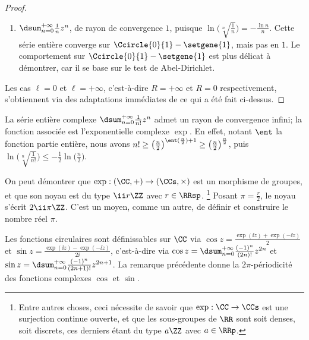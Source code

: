 \begin{proof}
\begin{itemize}
\begin{enumerate}[label=(\alph*)]
	        \item $\dsum_{n=0}^{+\infty}  \frac{1}{n} z^n$, 
	        de rayon de convergence $1$,
	        puisque 
	        $ \ln \big( \sqrt[n]{\frac{1}{n}} \big)
	        = -\frac{\ln n}{n}$.
	        Cette série entière converge sur $\Ccircle{0}{1} - \setgene{1}$, mais pas en $1$. 
	        Le comportement sur $\Ccircle{0}{1} - \setgene{1}$ est plus délicat à démontrer, car il se base sur le test de Abel-Dirichlet.
	    \end{enumerate}
    \end{itemize}


    Les cas $\ell = 0$ et $\ell = +\infty$,
    c'est-à-dire $R = +\infty$ et $R = 0$ respectivement,
    s'obtiennent via des adaptations immédiates de ce qui a été fait ci-dessus.
\end{proof}


\begin{example}
	La série entière complexe $\dsum_{n=0}^{+\infty} \frac{1}{n!} z^n$ admet un rayon de convergence infini; la fonction associée est l'exponentielle complexe $\exp$.
	En effet,
	notant $\ent$ la fonction partie entière, nous avons
	$n! \geq \big( \frac{n}{2} \big)^{\ent (\frac{n}{2}) + 1} \geq \big( \frac{n}{2} \big)^{\frac{n}{2}}$,
	puis
	$ \ln \big( \sqrt[n]{\frac{1}{n!}} \big)
	\leq
	  - \frac{1}{2} \ln \big( \frac{n}{2} \big)$.
\end{example}


\begin{remark}
	On peut démontrer que
	$\exp : (\CC , {+}) \to (\CCs, {\times})$ est un morphisme de groupes, et que son noyau est du type $\ii r \ZZ$ avec $r \in \RRsp$.%
	\footnote{
	    Entre autres choses, ceci nécessite de savoir que
	    $\exp: \CC \to \CCs$ est une surjection continue ouverte,
	    et
	    que les sous-groupes de $\RR$ sont soit denses, soit discrets, ces derniers étant du type $a \ZZ$ avec $a \in \RRp$. 
	}
	Posant $\pi = \frac{r}{2}$, le noyau s'écrit $2 \ii \pi \ZZ$.
	C'est un moyen, comme un autre, de définir et construire le nombre réel $\pi$.
\end{remark}


\begin{example} \label{cos-sin-analytic}
    Les fonctions circulaires sont définissables sur $\CC$ via
    $\cos z = \frac{\exp(\ii z) + \exp(- \ii z)}{2}$
    et
    $\sin z = \frac{\exp(\ii z) - \exp(- \ii z)}{2 \ii}$,
    c'est-à-dire via
    $\cos z = \dsum_{n=0}^{+\infty} \frac{(-1)^n}{(2n)!} z^{2n}$
    et
    $\sin z = \dsum_{n=0}^{+\infty} \frac{(-1)^n}{(2n+ 1)!} z^{2n+1}$.
    La remarque précédente donne la $2 \pi$-périodicité des fonctions complexes $\cos$ et $\sin$.
\end{example}


